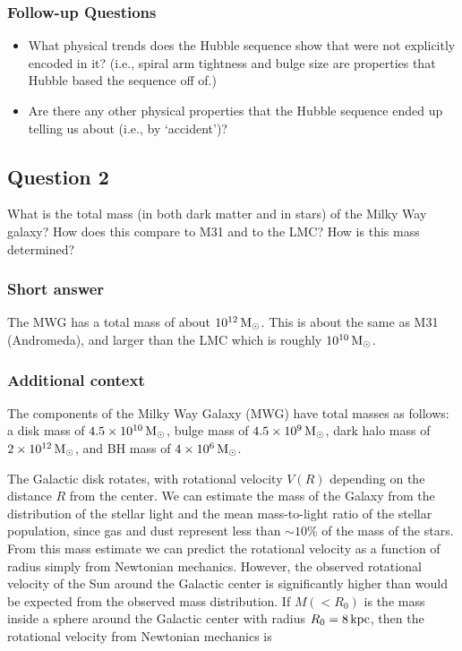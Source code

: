 \documentclass[a4paper,11pt]{article}
\begin{document}
\subsubsection{Follow-up Questions}

\begin{itemize}
    \item What physical trends does the Hubble sequence show that were not explicitly encoded in it? (i.e., spiral arm tightness and bulge size are properties that Hubble based the sequence off of.)
    \item Are there any other physical properties that the Hubble sequence ended up telling us about (i.e., by `accident')?
\end{itemize}



\newpage
\subsection{Question 2}

What is the total mass (in both dark matter and in stars) of the Milky Way galaxy? How does this compare to M31 and to the LMC? How is this mass determined?

\subsubsection{Short answer}

The MWG has a total mass of about $10^{12}\,{\rm M_\odot}$. This is about the same as M31 (Andromeda), and larger than the LMC which is roughly $10^{10}\,{\rm M_\odot}$.

\subsubsection{Additional context}

The components of the Milky Way Galaxy (MWG) have total masses as follows: a disk mass of $4.5\times10^{10}\,{\rm M_\odot}$, bulge mass of $4.5\times10^9\,{\rm M_\odot}$, dark halo mass of $2\times10^{12}\,{\rm M_\odot}$, and BH mass of $4\times10^6\,{\rm M_\odot}$.

{\noindent}The Galactic disk rotates, with rotational velocity $V(R)$ depending on the distance $R$ from the center. We can estimate the mass of the Galaxy from the distribution of the stellar light and the mean mass-to-light ratio of the stellar population, since gas and dust represent less than $\sim10$\% of the mass of the stars. From this mass estimate we can predict the rotational velocity as a function of radius simply from Newtonian mechanics. However, the observed rotational velocity of the Sun around the Galactic center is significantly higher than would be expected from the observed mass distribution. If $M(<R_0)$ is the mass inside a sphere around the Galactic center with radius $R_0=8\,{\rm kpc}$, then the rotational velocity from Newtonian mechanics is
\end{document}
